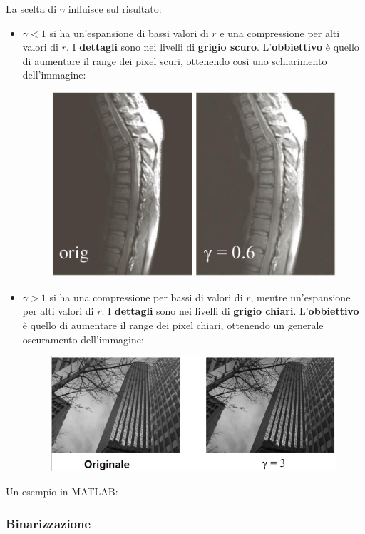 \documentclass[a4paper]{article}
\begin{document}
	\noindent
	La scelta di $\gamma$ influisce sul risultato:
	\begin{itemize}
		\item $\gamma < 1$ si ha un'espansione di bassi valori di $r$ e una compressione per alti valori di $r$. I \textbf{dettagli} sono nei livelli di \textbf{grigio scuro}. L'\textbf{obbiettivo} è quello di aumentare il range dei pixel scuri, ottenendo così uno schiarimento dell'immagine:
		\begin{figure}[!htp]
			\centering
			\includegraphics[width=.55\textwidth]{img/lab/trasformazione_non_lineare-1.png}
		\end{figure}
		
		\item $\gamma > 1$ si ha una compressione per bassi di valori di $r$, mentre un'espansione per alti valori di $r$. I \textbf{dettagli} sono nei livelli di \textbf{grigio chiari}. L'\textbf{obbiettivo} è quello di aumentare il range dei pixel chiari, ottenendo un generale oscuramento dell'immagine:
		\begin{figure}[!htp]
			\centering
			\includegraphics[width=.8\textwidth]{img/lab/trasformazione_non_lineare-2.png}
		\end{figure}
	\end{itemize}
	Un esempio in MATLAB:
	
	\newpage
	
	\subsubsection{Binarizzazione}
	
\end{document}
